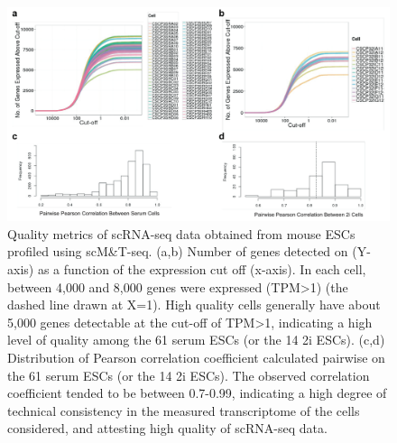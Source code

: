 \begin{figure}[htbp!]
\centering
\includegraphics[width=1.0\textwidth]{qc_rna}
\caption[Quality metrics of scRNA-seq data obtained from mouse ESCs profiled using scM\&T-seq.]{Quality metrics of scRNA-seq data obtained from mouse ESCs profiled using scM\&T-seq. (a,b) Number of genes detected on (Y-axis) as a function of the expression cut off (x-axis). In each cell, between 4,000 and 8,000 genes were expressed (TPM>1) (the dashed line drawn at X=1). High quality cells generally have about 5,000 genes detectable at the cut-off of TPM>1, indicating a high level of quality among the 61 serum ESCs (or the 14 2i ESCs). (c,d) Distribution of Pearson correlation coefficient calculated pairwise on the 61 serum ESCs (or the 14 2i ESCs). The observed correlation coefficient tended to be between 0.7-0.99, indicating a high degree of technical consistency in the measured transcriptome of the cells considered, and attesting high quality of scRNA-seq data.}
\label{fig:mt_qc_rna}
\end{figure}

